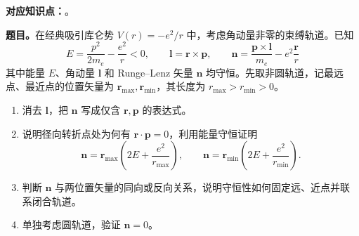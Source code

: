 \textbf{对应知识点：}。

\textbf{题目。}在经典吸引库仑势 $V(r)=-e^2/r$ 中，考虑角动量非零的束缚轨道。已知
\begin{equation}
  E=\frac{p^2}{2m_e}-\frac{e^2}{r}<0,\qquad
  \mathbf l=\mathbf r\times\mathbf p,\qquad
  \mathbf n=\frac{\mathbf p\times\mathbf l}{m_e}-e^2\frac{\mathbf r}{r}
\end{equation}
其中能量 $E$、角动量 $\mathbf l$ 和 Runge--Lenz 矢量 $\mathbf n$ 均守恒。先取非圆轨道，记最远点、最近点的位置矢量为 $\mathbf r_{\max},\mathbf r_{\min}$，其长度为 $r_{\max}>r_{\min}>0$。
\begin{enumerate}
  \item 消去 $\mathbf l$，把 $\mathbf n$ 写成仅含 $\mathbf r,\mathbf p$ 的表达式。
  \item 说明径向转折点处为何有 $\mathbf r\cdot\mathbf p=0$，利用能量守恒证明
    \begin{equation}
      \mathbf n=\mathbf r_{\max}\left(2E+\frac{e^2}{r_{\max}}\right),\qquad
      \mathbf n=\mathbf r_{\min}\left(2E+\frac{e^2}{r_{\min}}\right).
    \end{equation}
  \item 判断 $\mathbf n$ 与两位置矢量的同向或反向关系，说明守恒性如何固定远、近点并联系闭合轨道。
  \item 单独考虑圆轨道，验证 $\mathbf n=0$。
\end{enumerate}

